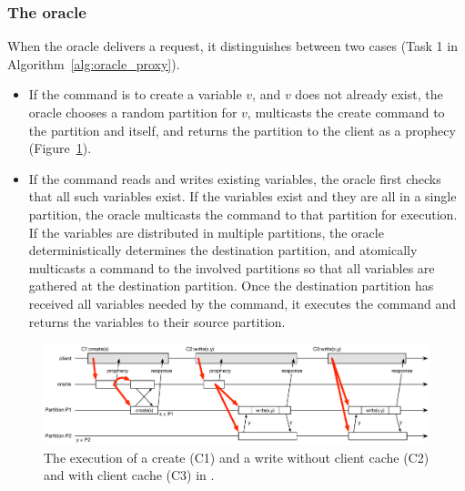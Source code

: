\subsubsection{The oracle} 

When the oracle delivers a request, it distinguishes between two cases (Task 1 in Algorithm~\ref{alg:oracle_proxy}).
\begin{itemize}
\item If the command is to create a variable $v$, and $v$ does not already exist, the oracle chooses a random partition for $v$, multicasts the create command to the partition and itself, and returns the partition to the client as a prophecy (Figure~\ref{fig:oracle_repartition}).
\item If the command reads and writes existing variables, the oracle first checks that all such variables exist.
If the variables exist and they are all in a single partition, the oracle multicasts the command to that partition for execution.
If the variables are distributed in multiple partitions, the oracle deterministically determines the destination partition, and atomically multicasts a command to the involved partitions so that all variables are gathered at the destination partition.
Once the destination partition has received all variables needed by the command, it executes the command and returns the variables to their source partition.

\end{itemize}






\begin{figure}
\begin{minipage}[b]{1\linewidth} %
\centering
      \includegraphics[width=\linewidth]{figures/dynastar}
\end{minipage}
\caption{The execution of a create (C1) and a write without client cache (C2) and with client cache (C3) in \dynastar.}
\label{fig:oracle_repartition}
\end{figure}

